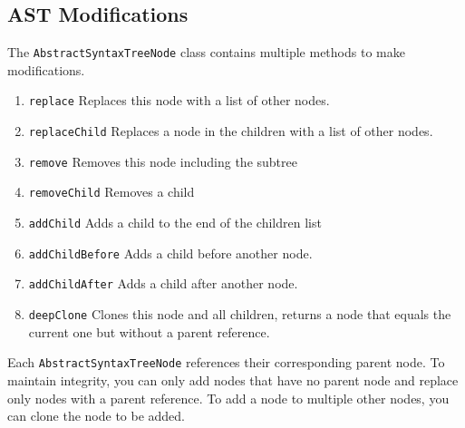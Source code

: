\subsection{AST Modifications}

The \verb|AbstractSyntaxTreeNode| class contains multiple methods to make modifications.

\begin{enumerate}
\item \verb|replace|  Replaces this node with a list of other nodes.
\item \verb|replaceChild|  Replaces a node in the children with a list of other nodes.
\item \verb|remove| Removes this node including the subtree
\item \verb|removeChild| Removes a child
\item \verb|addChild| Adds a child to the end of the children list
\item \verb|addChildBefore| Adds a child before another node.
\item \verb|addChildAfter| Adds a child after another node.
\item \verb|deepClone| Clones this node and all children, returns a node that equals the current one but without a parent reference.
\end{enumerate}

Each \verb|AbstractSyntaxTreeNode| references their corresponding parent node. To maintain integrity, you can only add nodes that have no parent node and replace only nodes with a parent reference. To add a node to multiple other nodes, you can clone the node to be added.
